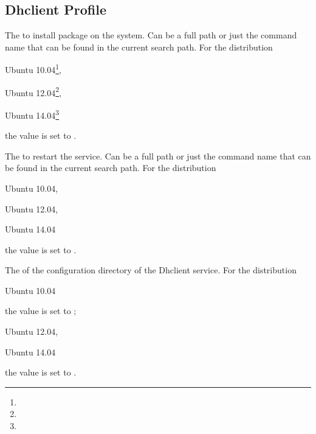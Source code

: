 \label{sec:dhclient_profile}
\subsection{Dhclient Profile}


The  to install package on the system. Can be a full path or
just the command name that can be found in the current search path. 
For the distribution
\begin{inparaitem}
\item[\TheDistribution{ubuntu}] Ubuntu 10.04\footnote{\TheUbuntuMaverickLTSDate},
\item[\TheDistribution{ubuntu}] Ubuntu 12.04\footnote{\TheUbuntuPreciseLTSDate},
\item[\TheDistribution{ubuntu}] Ubuntu 14.04\footnote{\TheUbuntuTrustyLTSDate}
\end{inparaitem}
the value is set to .


The  to restart the service. Can be a full path or
just the command name that can be found in the current search path. 
For the distribution
\begin{inparaitem}
\item[\TheDistribution{ubuntu}] Ubuntu 10.04,
\item[\TheDistribution{ubuntu}] Ubuntu 12.04,
\item[\TheDistribution{ubuntu}] Ubuntu 14.04
\end{inparaitem}
the value is set to .


The  of the configuration directory of the Dhclient service. 
For the distribution
\begin{inparaitem}
\item[\TheDistribution{ubuntu}] Ubuntu 10.04
\end{inparaitem}
the value is set to ;
\begin{inparaitem}
\item[\TheDistribution{ubuntu}] Ubuntu 12.04,
\item[\TheDistribution{ubuntu}] Ubuntu 14.04
\end{inparaitem}
the value is set to .

